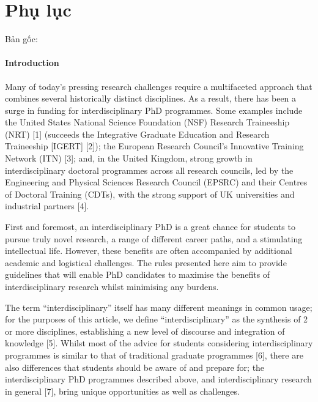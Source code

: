 \documentclass[12pt]{report}
\begin{document}
\section{Phụ lục}

Bản gốc:

\paragraph{Introduction}

Many of today’s pressing research challenges require a multifaceted approach that combines several historically distinct disciplines. As a result, there has been a surge in funding for interdisciplinary PhD programmes. Some examples include the United States National Science Foundation (NSF) Research Traineeship (NRT) [1] (succeeds the Integrative Graduate Education and Research Traineeship [IGERT] [2]); the European Research Council’s Innovative Training Network (ITN) [3]; and, in the United Kingdom, strong growth in interdisciplinary doctoral programmes across all research councils, led by the Engineering and Physical Sciences Research Council (EPSRC) and their Centres of Doctoral Training (CDTs), with the strong support of UK universities and industrial partners [4].

First and foremost, an interdisciplinary PhD is a great chance for students to pursue truly novel research, a range of different career paths, and a stimulating intellectual life. However, these benefits are often accompanied by additional academic and logistical challenges. The rules presented here aim to provide guidelines that will enable PhD candidates to maximise the benefits of interdisciplinary research whilst minimising any burdens.

The term “interdisciplinary” itself has many different meanings in common usage; for the purposes of this article, we define “interdisciplinary” as the synthesis of 2 or more disciplines, establishing a new level of discourse and integration of knowledge [5]. Whilst most of the advice for students considering interdisciplinary programmes is similar to that of traditional graduate programmes [6], there are also differences that students should be aware of and prepare for; the interdisciplinary PhD programmes described above, and interdisciplinary research in general [7], bring unique opportunities as well as challenges.
\end{document}

